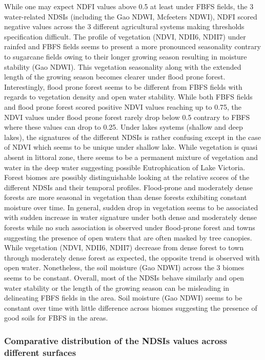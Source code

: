 \documentclass[12pt,oneside]{article}
\begin{document}
While one may expect NDFI values above 0.5 at least under FBFS fields, the 3 water-related NDSIs (including the Gao NDWI, Mcfeeters NDWI), NDFI scored negative values across the 3 different agricultural systems making thresholds specification difficult. The profile of vegetation (NDVI, NDII6, NDII7) under rainfed and FBFS fields seems to present a more pronounced seasonality contrary to sugarcane fields owing to their longer growing season resulting in moisture stability (Gao NDWI). This vegetation seasonality along with the extended length of the growing season becomes clearer under flood prone forest. Interestingly, flood prone forest seems to be different from FBFS fields with regards to vegetation density and open water stability. While both FBFS fields and flood prone forest scored positive NDVI values reaching up to 0.75, the NDVI values under flood prone forest rarely drop below 0.5 contrary to FBFS where these values can drop to 0.25. Under lakes systems (shallow and deep lakes), the signatures of the different NDSIs is rather confusing except in the case of NDVI which seems to be unique under shallow lake. While vegetation is quasi absent in littoral zone, there seems to be a permanent mixture of vegetation and water in the deep water suggesting possible Eutrophication of Lake Victoria. Forest biomes are possibly distinguishable looking at the relative scores of the different NDSIs and their temporal profiles. Flood-prone and moderately dense forests are more seasonal in vegetation than dense forests exhibiting constant moisture over time. In general, sudden drop in vegetation seems to be associated with sudden increase in water signature under both dense and moderately dense forests while no such association is observed under flood-prone forest and towns suggesting the presence of open waters that are often masked by tree canopies. While vegetation (NDVI, NDII6, NDII7) decrease from dense forest to town through moderately dense forest as expected, the opposite trend is observed with open water. Nonetheless, the soil moisture (Gao NDWI) across the 3 biomes seems to be constant. Overall, most of the NDSIs behave similarly and open water stability or the length of the growing season can be misleading in delineating FBFS fields in the area. Soil moisture (Gao NDWI) seems to be constant over time with little difference across biomes suggesting the presence of good soils for FBFS in the areas.

\hypertarget{II12}{%
\subsubsection{Comparative distribution of the NDSIs values across different surfaces}\label{II12}}
\end{document}
